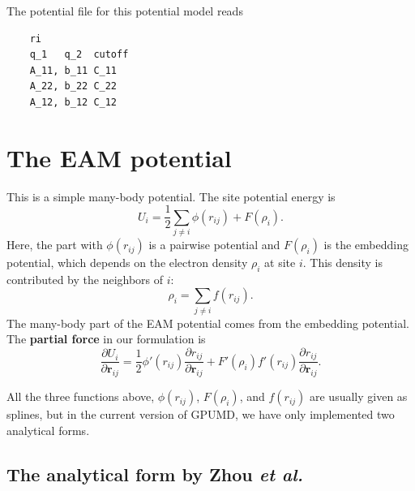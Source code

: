 \documentclass[12pt,a4paper]{report}
\newcommand{\vect}[1]{\boldsymbol{#1}}
\begin{document}
The potential file for this potential model reads
\begin{verbatim}
    ri
    q_1   q_2  cutoff
    A_11, b_11 C_11
    A_22, b_22 C_22
    A_12, b_12 C_12
\end{verbatim}


\section{The EAM potential}

This is a simple many-body potential. The site potential energy is
\begin{equation}
U_i = \frac{1}{2} \sum_{j\neq i} \phi(r_{ij}) + F (\rho_i).
\end{equation}
Here, the part with $\phi(r_{ij})$ is a pairwise potential and $F(\rho_i)$ is the embedding potential, which depends on the electron density $\rho_i$ at site $i$. This density is contributed by the neighbors of $i$:
\begin{equation}
\rho_i = \sum_{j\neq i} f(r_{ij}).
\end{equation}
The many-body part of the EAM potential comes from the embedding potential. The \textbf{partial force} in our formulation is
\begin{equation}
\frac{\partial U_i}{\partial \vect{r}_{ij}}
= \frac{1}{2}  \phi'(r_{ij})  \frac{\partial r_{ij}} {\partial \vect{r}_{ij}} +
F'(\rho_i)  f'(r_{ij}) \frac{\partial r_{ij}} {\partial \vect{r}_{ij}}.
\end{equation}

All the three functions above, $\phi(r_{ij})$, $F(\rho_i)$, and $f(r_{ij})$ are usually given as splines, but in the current version of GPUMD, we have only implemented two analytical forms.

\subsection{The analytical form by Zhou \textit{et al.}}
\end{document}
